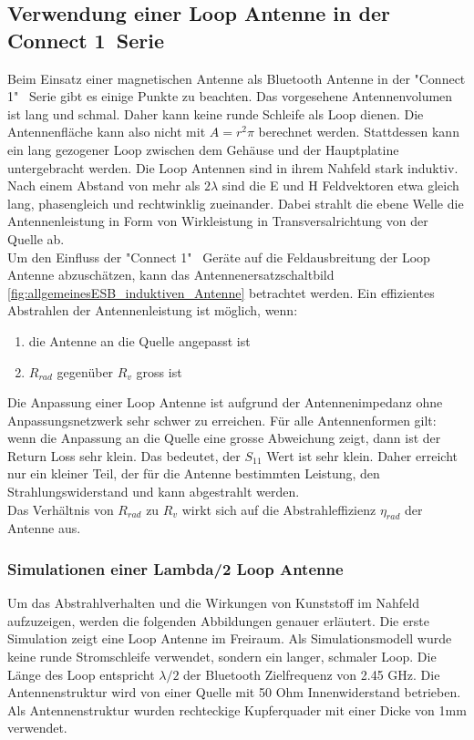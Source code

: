 \subsection{Verwendung einer Loop Antenne in der \glqq Connect 1\grqq \  Serie}
Beim Einsatz einer magnetischen Antenne als Bluetooth Antenne in der "Connect 1"  \ Serie gibt es einige Punkte zu beachten. Das vorgesehene Antennenvolumen ist lang und schmal. Daher kann keine runde Schleife als Loop dienen. Die Antennenfläche kann also nicht mit $A=r^{2}\pi$ berechnet werden. Stattdessen  kann ein lang gezogener Loop zwischen dem Gehäuse und der Hauptplatine untergebracht werden. Die Loop Antennen sind in ihrem Nahfeld stark induktiv. Nach einem Abstand von mehr als $2\lambda$ sind die E und H Feldvektoren etwa gleich lang, phasengleich und rechtwinklig zueinander. Dabei strahlt die  ebene Welle  die Antennenleistung in Form von Wirkleistung in Transversalrichtung von der Quelle ab.\\
Um den Einfluss der "Connect 1" \ Geräte auf die Feldausbreitung der Loop Antenne abzuschätzen, kann das Antennenersatzschaltbild \ref{fig:allgemeinesESB_induktiven_Antenne}  betrachtet werden. Ein effizientes Abstrahlen der Antennenleistung ist möglich, wenn:
  \begin{enumerate}[label={\alph*)}] 
     \item die Antenne an die Quelle angepasst ist 
     \item $R_{rad}$ gegenüber $R_{v}$ gross ist 
  \end{enumerate} 
Die Anpassung einer Loop Antenne ist aufgrund der Antennenimpedanz ohne Anpassungsnetzwerk sehr schwer zu erreichen. Für alle Antennenformen gilt: wenn die Anpassung an die Quelle eine grosse Abweichung zeigt, dann ist der Return Loss sehr klein. Das bedeutet, der $S_{11}$ Wert ist sehr klein. Daher erreicht nur ein kleiner Teil, der für die Antenne bestimmten Leistung, den Strahlungswiderstand und kann abgestrahlt werden.\\
Das Verhältnis von $R_{rad}$ zu $R_{v}$ wirkt sich auf die Abstrahleffizienz $\eta_{rad}$ der Antenne aus. 



\subsubsection{Simulationen einer Lambda/2 Loop Antenne}\label{sec:SimL2Loop}
Um das Abstrahlverhalten und die Wirkungen von Kunststoff im Nahfeld aufzuzeigen, werden die folgenden Abbildungen genauer erläutert.
Die erste Simulation zeigt eine Loop Antenne im Freiraum. Als Simulationsmodell wurde keine runde Stromschleife verwendet, sondern ein langer, schmaler Loop. Die Länge des Loop entspricht $\lambda/2$ der Bluetooth Zielfrequenz von 2.45 GHz. Die Antennenstruktur wird von einer Quelle mit 50 Ohm Innenwiderstand betrieben. Als Antennenstruktur wurden  rechteckige Kupferquader mit einer Dicke von 1mm verwendet.\\

